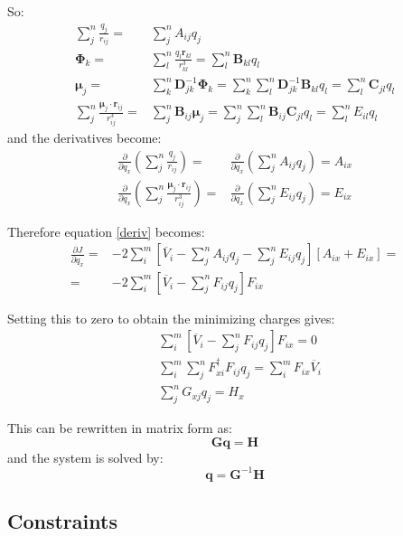 \documentclass[a4paper]{report}
\newcommand{\bs}{\boldsymbol}
\begin{document}
So:
\begin{align}
\sum_j^n \frac{q_j}{r_{ij}} =& \sum_j^n A_{ij} q_j \\
\bs{\Phi}_k =& \sum_l^n \frac{q_l \bs{r}_{kl}}{r_{kl}^3} = \sum_l^n \bs{B}_{kl} q_l \\
\bs{\mu}_j =& \sum_k^n \bs{D}^{-1}_{jk} \bs{\Phi}_k = \sum_k^n \sum_l^n
\bs{D}^{-1}_{jk} \bs{B}_{kl} q_l = \sum_l^n \bs{C}_{jl} q_l \\
\sum_j^n \frac{\bs{\mu}_j \cdot \bs{r}_{ij}}{r_{ij}^3} =& \sum_j^n \bs{B}_{ij}
\bs{\mu}_j = \sum_j^n \sum_l^n \bs{B}_{ij} \bs{C}_{jl} q_l = \sum_l^n E_{il} q_l
\end{align}
and the derivatives become:
\begin{align}
\frac{\partial}{\partial q_x} \left(\sum_j^n \frac{q_j}{r_{ij}}\right) =&
\frac{\partial}{\partial q_x} \left(\sum_j^n A_{ij} q_j\right) = A_{ix} \\
\frac{\partial}{\partial q_x} \left(\sum_j^n \frac{\bs{\mu}_j \cdot
\bs{r}_{ij}}{r_{ij}^3} \right) =& \frac{\partial}{\partial q_x} \left(\sum_j^n E_{ij}
q_j \right) = E_{ix}
\end{align}

Therefore equation \ref{deriv} becomes:
\begin{align}
\frac{\partial J}{\partial q_x} =& - 2 \sum_i^m \left[ \overline{V}_i - \sum_j^n
A_{ij} q_j - \sum_j^n E_{ij} q_j \right] \left[ A_{ix} + E_{ix} \right] = \nonumber \\
=& -2\sum_i^m \left[ \overline{V}_i - \sum_j^n F_{ij} q_j\right] F_{ix}
\end{align}

Setting this to zero to obtain the minimizing charges gives:
\begin{align}
&\sum_i^m \left[\overline{V}_i - \sum_j^n F_{ij} q_j \right] F_{ix} = 0 \\
&\sum_i^m \sum_j^n F_{xi}^\dagger F_{ij} q_j = \sum_i^m F_{ix} \overline{V}_i \\
&\sum_j^n G_{xj} q_j = H_x
\end{align}

This can be rewritten in matrix form as:
\begin{equation}
\bs{G} \bs{q} = \bs{H}
\end{equation}
and the system is solved by:
\begin{equation}
\bs{q} = \bs{G}^{-1} \bs{H}
\end{equation}

\subsection*{Constraints}
\end{document}
